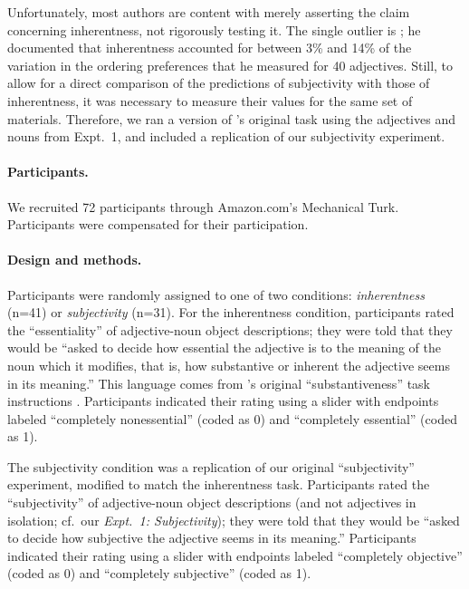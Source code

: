 \documentclass[12pt]{article}
\newcommand{\jd}[1]{\textcolor{red}{[jd: #1]}}
\begin{document}
Unfortunately, most authors are content with merely asserting the claim concerning inherentness, not rigorously testing it. The single outlier is \cite{martin1969}; he documented that inherentness accounted for between 3\% and 14\% of the variation in the ordering preferences that he measured for 40 adjectives.  Still, to allow for a direct comparison of the predictions of subjectivity with those of inherentness, it was necessary to measure their values for the same set of materials. Therefore, we ran a version of \citeauthor{martin1969}'s original task using the adjectives and nouns from Expt.~1, and included a replication of our subjectivity experiment.%

\paragraph{Participants.} We recruited 72 participants through Amazon.com's Mechanical Turk. Participants were compensated for their participation.

\paragraph{Design and methods.} Participants were randomly assigned to one of two conditions: \emph{inherentness} (n=41) or \emph{subjectivity} (n=31). For the inherentness condition, participants rated the ``essentiality'' of adjective-noun object descriptions; they were told that they would be ``asked to decide how essential the adjective is to the meaning of the noun which it modifies, that is, how substantive or inherent the adjective seems in its meaning.'' This language comes from \citeauthor{martin1969}'s original ``substantiveness'' task instructions \citep[Expt.~VII]{martin1969}. Participants indicated their rating using a slider with endpoints labeled ``completely nonessential'' (coded as 0) and ``completely essential'' (coded as 1).

The subjectivity condition was a replication of our original ``subjectivity'' experiment, modified to match the inherentness task. Participants rated the ``subjectivity'' of adjective-noun object descriptions (and not adjectives in isolation; cf.~our \emph{Expt.~1: Subjectivity}); they were told that they would be ``asked to decide how subjective the adjective seems in its meaning.'' Participants indicated their rating using a slider with endpoints labeled ``completely objective'' (coded as 0) and ``completely subjective'' (coded as 1).
\end{document}
